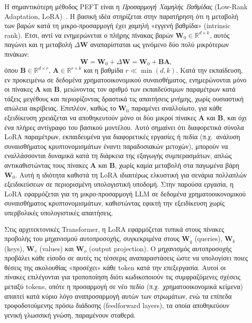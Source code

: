 Η σημαντικότερη μέθοδος PEFT είναι η \emph{Προσαρμογή Χαμηλής Βαθμίδας}
(Low-Rank Adaptation, LoRA)~\cite{hu2021lora}. Η βασική ιδέα στηρίζεται στην
παρατήρηση ότι η μεταβολή των βαρών κατά τη μικρο-προσαρμογή έχει χαμηλή
«εγγενή βαθμίδα» (intrinsic rank). Έτσι, αντί να ενημερώνεται ο πλήρης
πίνακας βαρών $\mathbf{W}_0 \in \mathbb{R}^{d \times k}$, αυτός παγώνει και η
μεταβολή $\Delta\mathbf{W}$ αναπαρίσταται ως γινόμενο δύο πολύ μικρότερων
πινάκων:
\begin{equation}
    \mathbf{W} = \mathbf{W}_0 + \Delta\mathbf{W}
    = \mathbf{W}_0 + \mathbf{B}\mathbf{A},
    \label{eq:lora}
\end{equation}
όπου $\mathbf{B} \in \mathbb{R}^{d \times r}$, $\mathbf{A} \in \mathbb{R}^{r
\times k}$ και η βαθμίδα $r \ll \min(d, k)$. Κατά την εκπαίδευση, εν
προκειμένω σε δεδομένα χρηματοοικονομικού συναισθήματος, ενημερώνονται μόνο
οι πίνακες $\mathbf{A}$ και $\mathbf{B}$, μειώνοντας τον αριθμό των
εκπαιδεύσιμων παραμέτρων κατά τάξεις μεγέθους και περιορίζοντας δραστικά τις
απαιτήσεις μνήμης, χωρίς ουσιαστική απώλεια ακρίβειας. Επιπλέον, καθώς το
$\mathbf{W}_0$ παραμένει αναλλοίωτο, για κάθε εξειδίκευση χρειάζεται να
αποθηκευτούν μόνο οι δύο μικροί πίνακες $\mathbf{A}$ και $\mathbf{B}$, και
όχι ένα πλήρες αντίγραφο του βασικού μοντέλου. Αυτό σημαίνει ότι διαφορετικά
σύνολα LoRA παραμέτρων, εκπαιδευμένα για διαφορετικές εργασίες ή πεδία
(π.χ.\ ανάλυση συναισθήματος κρυπτονομισμάτων έναντι παραδοσιακών μετοχών),
μπορούν να εναλλάσσονται δυναμικά κατά τη διάρκεια της εξαγωγής συμπερασμάτων,
απλώς αντικαθιστώντας τους πίνακες $\mathbf{A}$ και $\mathbf{B}$, χωρίς καμία
μεταβολή στα παγωμένα βάρη $\mathbf{W}_0$. Αυτή η ιδιότητα καθιστά τη LoRA
ιδιαιτέρως ελκυστική για σενάρια πολλαπλών εξειδικεύσεων σε περιορισμένη
υπολογιστική υποδομή. Στην παρούσα εργασία, η LoRA εφαρμόζεται για τη
μικρο-προσαρμογή LLM σε δεδομένα χρηματοοικονομικού συναισθήματος
κρυπτονομισμάτων, καθιστώντας εφικτή την εξειδίκευση χωρίς υπερβολικές
υπολογιστικές απαιτήσεις.

Στις αρχιτεκτονικές Transformer, η LoRA εφαρμόζεται τυπικά στους πίνακες
προβολής του μηχανισμού αυτοπροσοχής, συγκεκριμένα στους $\mathbf{W}_q$
(queries), $\mathbf{W}_k$ (keys), $\mathbf{W}_v$ (values) και $\mathbf{W}_o$
(output projection). Ο μηχανισμός αυτοπροσοχής προβάλει κάθε είσοδο σε
αυτές τις τέσσερις αναπαραστάσεις ώστε να υπολογίσει ποιες θέσεις της
ακολουθίας «προσέχει» κάθε token κατά την επεξεργασία. Αυτοί οι πίνακες
επιλέγονται για τροποποίηση διότι κωδικοποιούν τις συμφραζόμενες σχέσεις
μεταξύ tokens, οπότε η προσαρμογή σε νέο πεδίο (π.χ.\ χρηματοοικονομικά
κείμενα) απαιτεί κατά κύριο λόγο αναπροσαρμογή αυτών των στρωμάτων, ενώ
τα επίπεδα τροφοδοτούμενης πρόσω διάδοσης (feedforward layers), τα οποία
αποθηκεύουν γενική γλωσσική γνώση, παραμένουν σταθερά.


